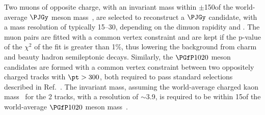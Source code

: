 Two muons of opposite charge, with an invariant mass within $\pm$150\MeVcc of the world-average $\PJGy$ meson mass~\cite{pdg2018}, are selected to reconstruct a $\PJGy$ candidate, with a mass resolution of typically 15--30\MeVcc, depending on the dimuon rapidity and \pt. The muon pairs are fitted with a common vertex constraint and are kept if the p-value of the $\chi^2$ of the fit is greater than 1\%, thus lowering the background from charm and beauty hadron semileptonic decays. 
Similarly, the $\Pphi$ meson candidates are formed with a common vertex constraint between two oppositely charged tracks with $\pt>300$\MeVc, both required to pass standard selections described in Ref.~\cite{Khachatryan:2016odn}. %
The invariant mass, assuming the world-average charged kaon mass~\cite{pdg2018} for the 2 tracks, with a resolution of $\sim$3.9\MeVcc, is required to be within 15\MeVcc of the world-average $\Pphi$ meson mass~\cite{pdg2018}.

